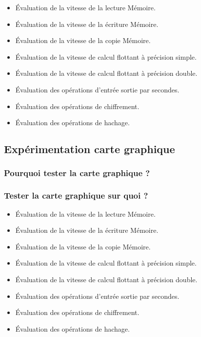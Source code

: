 \begin{itemize}
\item Évaluation de la vitesse de la lecture Mémoire. 
\item Évaluation de la vitesse de la écriture Mémoire. 
\item Évaluation de la vitesse de la copie Mémoire. 
\item Évaluation de la vitesse de calcul flottant à précision simple. 
\item Évaluation de la vitesse de calcul flottant à précision double.
\item Évaluation des opérations d'entrée sortie par secondes.
\item Évaluation des opérations de chiffrement. 
\item Évaluation des opérations de hachage.

\end{itemize}


\subsection{Expérimentation carte graphique}

\subsubsection{Pourquoi tester la carte graphique ? }

\subsubsection{Tester la carte graphique sur quoi ?  }

\begin{itemize}
\item Évaluation de la vitesse de la lecture Mémoire. 
\item Évaluation de la vitesse de la écriture Mémoire. 
\item Évaluation de la vitesse de la copie Mémoire. 
\item Évaluation de la vitesse de calcul flottant à précision simple. 
\item Évaluation de la vitesse de calcul flottant à précision double. 
\item Évaluation des opérations d'entrée sortie par secondes. 
\item Évaluation des opérations de chiffrement. 
\item Évaluation des opérations de hachage.

\end{itemize}

